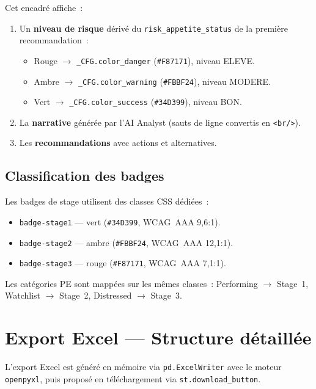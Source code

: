 \documentclass[12pt,a4paper]{article}
\begin{document}
Cet encadr\'e affiche~:
\begin{enumerate}[leftmargin=2em]
    \item Un \textbf{niveau de risque} d\'eriv\'e du \texttt{risk\_appetite\_status} de la premi\`ere recommandation~:
    \begin{itemize}
        \item Rouge $\to$ \texttt{\_CFG.color\_danger} (\texttt{\#F87171}), niveau ELEVE.
        \item Ambre $\to$ \texttt{\_CFG.color\_warning} (\texttt{\#FBBF24}), niveau MODERE.
        \item Vert $\to$ \texttt{\_CFG.color\_success} (\texttt{\#34D399}), niveau BON.
    \end{itemize}
    \item La \textbf{narrative} g\'en\'er\'ee par l'AI Analyst (sauts de ligne convertis en \texttt{<br/>}).
    \item Les \textbf{recommandations} avec actions et alternatives.
\end{enumerate}

\subsection{Classification des badges}

Les badges de stage utilisent des classes CSS d\'edi\'ees~:
\begin{itemize}[leftmargin=2em]
    \item \texttt{badge-stage1} --- vert (\texttt{\#34D399}, WCAG~AAA 9,6:1).
    \item \texttt{badge-stage2} --- ambre (\texttt{\#FBBF24}, WCAG~AAA 12,1:1).
    \item \texttt{badge-stage3} --- rouge (\texttt{\#F87171}, WCAG~AAA 7,1:1).
\end{itemize}

Les cat\'egories PE sont mapp\'ees sur les m\^emes classes~: Performing $\to$ Stage~1, Watchlist $\to$ Stage~2, Distressed $\to$ Stage~3.


\section{Export Excel --- Structure d\'etaill\'ee}
\label{sec:export}

L'export Excel est g\'en\'er\'e en m\'emoire via \texttt{pd.ExcelWriter} avec le moteur \texttt{openpyxl}, puis propos\'e en t\'el\'echargement via \texttt{st.download\_button}.
\end{document}

